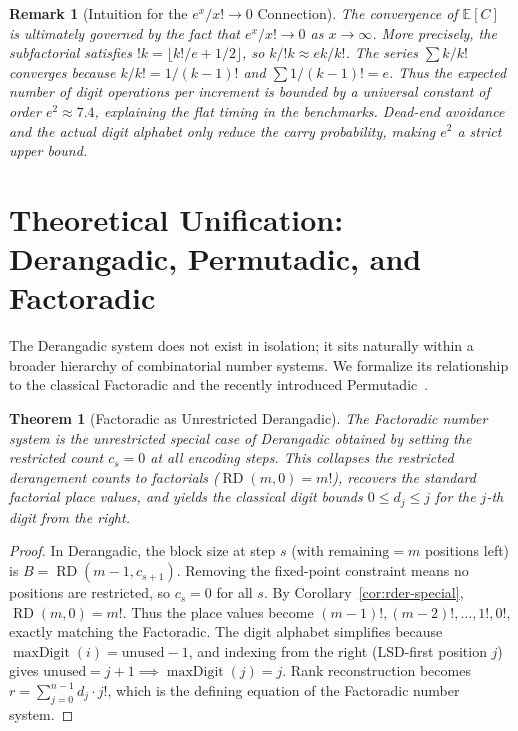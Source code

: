 \documentclass[11pt,a4paper]{article}
\newtheorem{theorem}{Theorem}[section]
\newtheorem{remark}{Remark}[section]
\newcommand{\subfact}[1]{!{#1}} %
\newcommand{\rder}[2]{\operatorname{RD}(#1,#2)} %
\newcommand{\maxd}[1]{\operatorname{maxDigit}(#1)}
\begin{document}
    \begin{remark}[Intuition for the $e^x/x! \to 0$ Connection]
        The convergence of $\mathbb{E}[C]$ is ultimately governed by the fact that
        $e^x/x! \to 0$ as $x \to \infty$. More precisely, the subfactorial satisfies
        $\subfact{k} = \lfloor k!/e + 1/2 \rfloor$, so $k/\subfact{k} \approx ek/k!$.
        The series $\sum k/k!$ converges because $k/k! = 1/(k-1)!$ and
        $\sum 1/(k-1)! = e$. Thus the expected number of digit operations per
        increment is bounded by a universal constant of order $e^2 \approx 7.4$,
        explaining the flat timing in the benchmarks. Dead-end avoidance and the
        actual digit alphabet only reduce the carry probability, making $e^2$ a
        strict upper bound.
    \end{remark}

    \section{Theoretical Unification: Derangadic, Permutadic, and Factoradic}
    \label{sec:unification}

    The Derangadic system does not exist in isolation; it sits naturally within
    a broader hierarchy of combinatorial number systems. We formalize its
    relationship to the classical Factoradic and the recently introduced
    Permutadic~\cite{permutadic}.

    \begin{theorem}[Factoradic as Unrestricted Derangadic]
        \label{thm:factoradic-limit}
        The Factoradic number system is the unrestricted special case of Derangadic
        obtained by setting the restricted count $c_s = 0$ at all encoding steps.
        This collapses the restricted derangement counts to factorials
        ($\rder{m}{0} = m!$), recovers the standard factorial place values, and
        yields the classical digit bounds $0 \leq d_j \leq j$ for the $j$-th digit
        from the right.
    \end{theorem}

    \begin{proof}
        In Derangadic, the block size at step $s$ (with $\text{remaining} = m$
        positions left) is $B = \rder{m-1}{c_{s+1}}$. Removing the fixed-point
        constraint means no positions are restricted, so $c_s = 0$ for all $s$.
        By Corollary~\ref{cor:rder-special}, $\rder{m}{0} = m!$. Thus the place
        values become $(m-1)!, (m-2)!, \dots, 1!, 0!$, exactly matching the
        Factoradic. The digit alphabet simplifies because $\maxd{i} = \text{unused} - 1$,
        and indexing from the right (LSD-first position $j$) gives
        $\text{unused} = j+1 \implies \maxd{j} = j$. Rank reconstruction becomes
        $r = \sum_{j=0}^{n-1} d_j \cdot j!$, which is the defining equation of the
        Factoradic number system.
    \end{proof}
\end{document}

